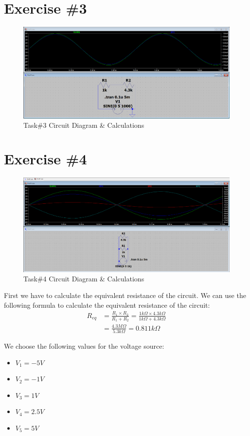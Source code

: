 \section{Exercise \#3}
\begin{figure}[h]
    \centering
    \includegraphics[width=1\textwidth]{assets/taks_3.png}
    \caption{Task\#3 Circuit Diagram \& Calculations}
\end{figure}

\newpage
\thispagestyle{plain}

\section{Exercise \#4}
\begin{figure}[h]
    \centering
    \includegraphics[width=.75\textwidth]{assets/taks_4.png}
    \caption{Task\#4 Circuit Diagram \& Calculations}
\end{figure}

First we have to calculate the equivalent resistance of the circuit. We can use the following formula to calculate the equivalent resistance of the circuit:
\begin{align*}
    R_{eq} &= \frac{R_1\times R_2}{R_1 + R_2} = \frac{1k\Omega \times 4.3k\Omega}{1k\Omega + 4.3k\Omega} \\
    &= \frac{4.3M\Omega}{5.3k\Omega} = 0.811k\Omega
\end{align*}

We choose the following values for the voltage source:
\begin{itemize}
    \item \(V_1 = -5V\)
    \item \(V_2 = -1V\)
    \item \(V_3 = 1V\)
    \item \(V_4 = 2.5V\)
    \item \(V_5 = 5V\)
\end{itemize}


